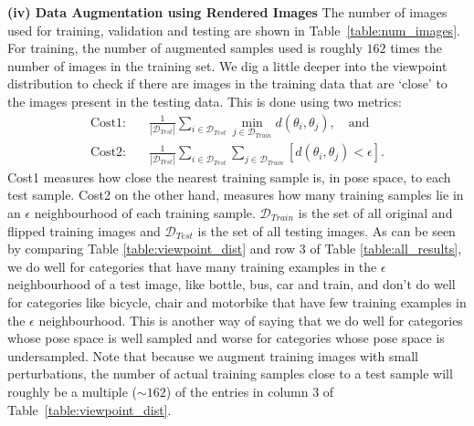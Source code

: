 \documentclass[10pt,twocolumn,letterpaper]{article}
\newcommand{\myparagraph}[1]{\smallskip\noindent\textbf{#1}}
\begin{document}
	\myparagraph{(iv) Data Augmentation using Rendered Images} 
	The number of images used for training, validation and testing are shown in Table~\ref{table:num_images}. For training, the number of augmented samples used is roughly $162$ times the number of images in the training set. We dig a little deeper into the viewpoint distribution to check if there are images in the training data that are `close' to the images present in the testing data. This is done using two metrics:
	\begin{align}
		\text{Cost1:} &\hspace{1em} \frac{1}{|\mathcal{D}_{Test}|} \sum_{i \in \mathcal{D}_{Test}} \min_{j \in \mathcal{D}_{Train}} d(\theta_i, \theta_j), \hspace{1em}\text{and} \\
		\text{Cost2:} &\hspace{1em} \frac{1}{|\mathcal{D}_{Test}|} \sum_{i \in \mathcal{D}_{Test}} \sum_{j \in \mathcal{D}_{Train}} \left [ d(\theta_i, \theta_j) < \epsilon \right ] .
	\end{align}
	Cost1 measures how close the nearest training sample is, in pose space, to each test sample. Cost2 on the other hand, measures how many training samples lie in an $\epsilon$ neighbourhood of each training sample. $\mathcal{D}_{Train}$ is the set of all original and flipped training images and $\mathcal{D}_{Test}$ is the set of all testing images. As can be seen by comparing Table \ref{table:viewpoint_dist} and row 3 of Table \ref{table:all_results}, we do well for categories that have many training examples in the $\epsilon$ neighbourhood of a test image, like bottle, bus, car and train, and don't do well for categories like bicycle, chair and motorbike that have few training examples in the $\epsilon$ neighbourhood. This is another way of saying that we do well for categories whose pose space is well sampled and worse for categories whose pose space is undersampled. Note that because we augment training images with small perturbations, the number of actual training samples close to a test sample will roughly be a multiple ($\sim 162$) of the entries in column 3 of Table~\ref{table:viewpoint_dist}.
	
\end{document}
